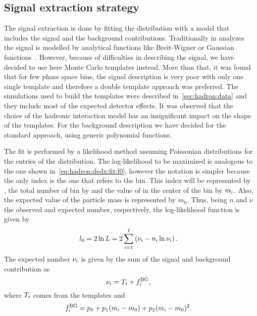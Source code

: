 \subsection{Signal extraction strategy}
\label{sec:hadron:vzero:signal}


The signal extraction is done by fitting the \minv distribution
with a model that includes the signal and the background contributions.
Traditionally in \NASixtyOne analyzes the signal
is modelled by analytical functions like Breit-Wigner
or Gaussian functions~\cite{Abgrall:2015hmv,Aduszkiewicz:2015dmr}. 
However, because of difficulties in describing
the \kzeros signal, we have decided to use here
Monte Carlo templates instead. More than that, it was found
that for few \kzeros phase space bins,
the signal description is very poor
with only one single template and therefore a double template approach
was preferred.
The simulations used to build the templates were described
in~\cref{sec:hadron:data} and they include most of the expected
detector effects. It was observed that the choice of the
hadronic interaction model has an insignificant impact
on the shape of the templates.
For the background description we have decided
for the standard approach, using generic polynomial functions.



The fit is performed by a likelihood method assuming Poissonian
distributions for the entries of the \minv distribution.
The log-likelihood to be maximized is analogous to the one shown
in~\cref{eq:hadron:dedx:fit:l0}, however the notation is
simpler because the only index is the one
that refers to the \minv bin. This index will be represented by \imass,
the total number of \minv bin by \nmass and the value of \minv in the center
of the bin by $m_i$. Also, the expected value of the particle mass
is represented by $m_0$.
Thus, being $n$ and $\nu$ the observed and expected number, respectively,
the log-likelihood function is given by
\begin{equation}
  l_0 = 2\ln L = 2\sum_{i=1}^{I} \left(\nu_{i} - n_{i}\ln\nu_{i}\right). 
  \label{eq:hadron:vzero:fit:l0}
\end{equation}
The expected number $\nu_i$ is given by the sum of the signal
and background contribution as
\begin{equation}
  \nu_i = T_i + f^\text{BG}_i, 
  \label{eq:hadron:vzero:fit:nu}
\end{equation}
where $T_i$ comes from the templates and
\begin{equation}
  f^\text{BG}_i = p_0 + p_1(m_i-m_0)+p_2(m_i-m_0)^2.
  \label{eq:hadron:vzero:fit:bg}
\end{equation}


